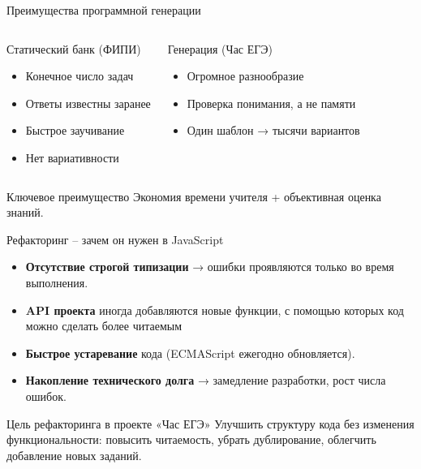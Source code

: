 \documentclass[aspectratio=169,12pt]{beamer}
\begin{document}
\begin{frame}{Преимущества программной генерации}
    \begin{columns}[T]
        \begin{block}{Статический банк (ФИПИ)}
            \begin{itemize}
                \item Конечное число задач
                \item Ответы известны заранее
                \item Быстрое заучивание
                \item Нет вариативности
            \end{itemize}
        \end{block}
        \begin{block}{Генерация (Час ЕГЭ)}
            \begin{itemize}
                \item Огромное разнообразие
                \item Проверка понимания, а не памяти
                \item Один шаблон → тысячи вариантов
            \end{itemize}
        \end{block}
    \end{columns}
    \vfill
    \begin{alertblock}{Ключевое преимущество}
        Экономия времени учителя + объективная оценка знаний.
    \end{alertblock}
\end{frame}

\begin{frame}{Рефакторинг – зачем он нужен в JavaScript}
    \begin{itemize}
        \item \textbf{Отсутствие строгой типизации} → ошибки проявляются только во время выполнения.
        \item \textbf{API проекта} иногда добавляются новые функции, с помощью которых код можно сделать более читаемым
        \item \textbf{Быстрое устаревание} кода (ECMAScript ежегодно обновляется).
        \item \textbf{Накопление технического долга} → замедление разработки, рост числа ошибок.
    \end{itemize}
    \vfill
    \begin{exampleblock}{Цель рефакторинга в проекте «Час ЕГЭ»}
        Улучшить структуру кода без изменения функциональности: повысить читаемость, убрать дублирование, облегчить добавление новых заданий.
    \end{exampleblock}
\end{frame}
\end{document}
